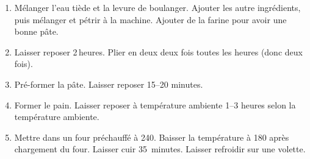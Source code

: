 
\begin{ingredients}
\end{ingredients}


\begin{recipe}
  \begin{enumerate}

  \item Mélanger l'eau tiède et la levure de boulanger.  Ajouter les
    autre ingrédients, puis mélanger et pétrir à la machine.  Ajouter
    de la farine pour avoir une bonne pâte.
    
  \item Laisser reposer 2$\,$\fracH heures.  Plier en deux deux fois toutes
    les heures (donc deux fois).
    
  \item Pré-former la pâte.  Laisser reposer 15--20 minutes.
    
  \item Former le pain.  Laisser reposer à température ambiente 1--3
    heures selon la température ambiente.
    
  \item Mettre dans un four préchauffé à 240\degreeC.  Baisser la
    température à 180\degreeC{} après chargement du four.  Laisser cuir
    35~minutes.  Laisser refroidir sur une volette.

  \end{enumerate}
\end{recipe}

